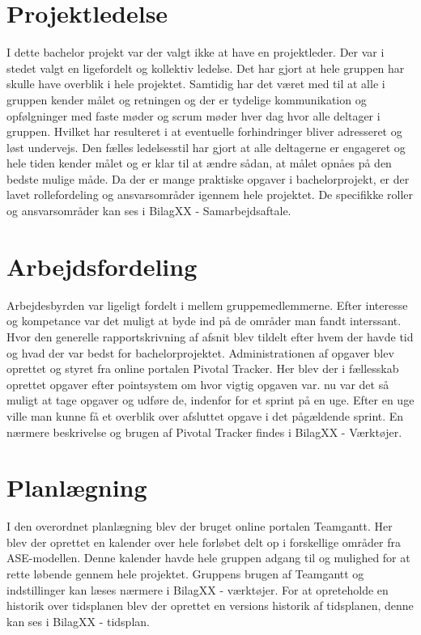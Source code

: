\chapter{Projektledelse}
I dette bachelor projekt var der valgt ikke at have en projektleder. Der var i stedet valgt en ligefordelt og kollektiv ledelse. Det har gjort at hele gruppen har skulle have overblik i hele projektet. Samtidig har det været med til at alle i gruppen kender målet og retningen og der er tydelige kommunikation og opfølgninger med faste møder og scrum møder hver dag hvor alle deltager i gruppen. Hvilket har resulteret i at eventuelle forhindringer bliver adresseret og løst undervejs. Den fælles ledelsesstil har gjort at alle deltagerne er engageret og hele tiden kender målet og er klar til at ændre sådan, at målet opnåes på den bedste mulige måde. Da der er mange praktiske opgaver i bachelorprojekt, er der lavet rollefordeling og ansvarsområder igennem hele projektet. De specifikke roller og ansvarsområder kan ses i BilagXX - Samarbejdsaftale.



\chapter{Arbejdsfordeling}
Arbejdesbyrden var ligeligt fordelt i mellem gruppemedlemmerne. Efter interesse og kompetance var det muligt at byde ind på de områder man fandt interssant. Hvor den generelle rapportskrivning af afsnit blev tildelt efter hvem der havde tid og hvad der var bedst for bachelorprojektet. Administrationen  af opgaver blev oprettet og styret fra online portalen Pivotal Tracker. Her blev der i fællesskab oprettet opgaver efter pointsystem om hvor vigtig opgaven var. nu var det så muligt at tage opgaver og udføre de, indenfor for et sprint på en uge. Efter en uge ville man kunne få et overblik over afsluttet opgave i det pågældende sprint. En nærmere beskrivelse og brugen af Pivotal Tracker findes i BilagXX - Værktøjer. 





\chapter{Planlægning}
I den overordnet planlægning blev der bruget online portalen Teamgantt. Her blev der oprettet en kalender over hele forløbet delt op i forskellige områder fra ASE-modellen. Denne kalender havde hele gruppen adgang til og mulighed for at rette løbende gennem hele projektet. Gruppens brugen af Teamgantt og indstillinger kan læses nærmere i BilagXX - værktøjer. For at opreteholde en historik over tidsplanen blev der oprettet en versions historik af tidsplanen, denne kan ses i BilagXX - tidsplan. 

